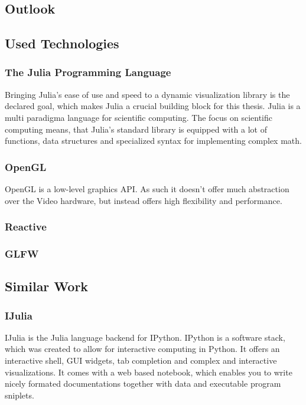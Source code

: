 \subsection{Outlook}

\subsection{Used Technologies}


\subsubsection{The Julia Programming Language}
Bringing Julia's ease of use and speed to a dynamic visualization library is the declared goal, which makes Julia a crucial building block for this thesis.
Julia is a multi paradigma language for scientific computing.
The focus on scientific computing means, that Julia's standard library is equipped with a lot of functions, data structures and specialized syntax for implementing complex math.


\subsubsection{OpenGL}
OpenGL is a low-level graphics API. As such it doesn't offer much abstraction over the Video hardware, but instead offers high flexibility and performance.


\subsubsection{Reactive}
\subsubsection{GLFW}


\subsection{Similar Work}

\subsubsection{IJulia}
IJulia is the Julia language backend for IPython.
IPython is a software stack, which was created to allow for interactive computing in Python.
It offers an interactive shell, \ac{GUI} widgets, tab completion and complex and interactive visualizations.
It comes with a web based notebook, which enables you to write nicely formated documentations together with data and executable program sniplets.

